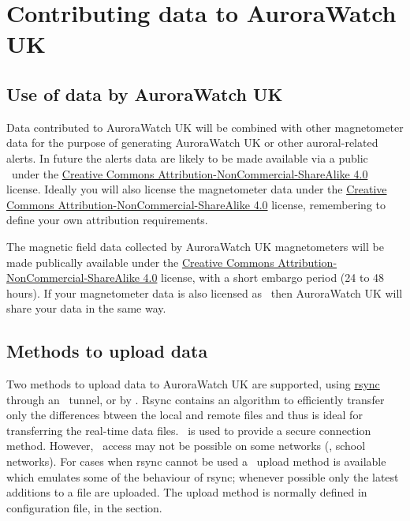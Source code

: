 \chapter{Contributing data to AuroraWatch UK}

\section{Use of data by AuroraWatch UK }

Data contributed to AuroraWatch UK will be combined with other
magnetometer data for the purpose of generating AuroraWatch UK or
other auroral-related alerts. In future the alerts data are likely to
be made available via a public \api\ under the
\href{\ccByNcSaFourUrl}{Creative Commons
  Attribution-NonCommercial-ShareAlike 4.0} license. Ideally you will
also license the magnetometer data under the
\href{\ccByNcSaFourUrl}{Creative Commons
  Attribution-NonCommercial-ShareAlike 4.0} license, remembering to
define your own attribution requirements.


The magnetic field data collected by AuroraWatch UK magnetometers will
be made publically available under the
\href{\ccByNcSaFourUrl}{Creative Commons
  Attribution-NonCommercial-ShareAlike 4.0} license, with a short
embargo period (24 to 48 hours). If your magnetometer data is also
licensed as \ccByNcSaFour\ then AuroraWatch UK will share your data in
the same way.

\section{Methods to upload data}
Two methods to upload data to AuroraWatch UK are supported, using
\href{\rsyncUrl}{rsync} through an \ssh\ tunnel, or by \http. Rsync
contains an algorithm to efficiently transfer only the differences
btween the local and remote files and thus is ideal for transferring
the real-time data files. \ssh\ is used to provide a secure connection
method. However, \ssh\ access may not be possible on some networks
(\eg, school networks). For cases when rsync cannot be used a \http\
upload method is available which emulates some of the behaviour of
rsync; whenever possible only the latest additions to a file are
uploaded. The upload method is normally defined in 
configuration file, in the \filename{[upload]} section.

